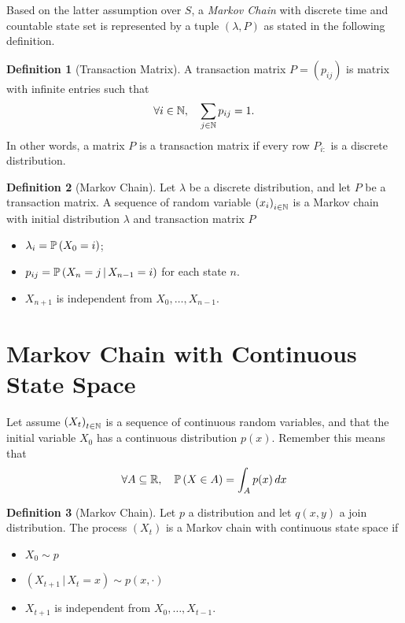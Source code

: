 \documentclass{report}
\theoremstyle{definition}
\newtheorem{defn}{Definition}
\begin{document}
Based on the latter assumption over $S$, a \textit{Markov Chain}  with
discrete time and countable state set is represented by a tuple 
$\left( \lambda,P \right)$ as stated in the following definition.

\begin{defn}[Transaction Matrix]
  A transaction matrix $P=\left( p_{ij} \right)$ is matrix with infinite entries 
  such that
  \begin{equation}
    \forall i\in\mathbb{N},\quad \sum_{j\in\mathbb{N}} p_{ij} = 1.
    \label{eq:transaction-matrix}
  \end{equation}
  In other words, a matrix $P$ is a transaction matrix if every row $P_{i:}$
  is a discrete distribution.
\end{defn}
\begin{defn}[Markov Chain]
  Let $\lambda$ be a discrete distribution, and let $P$ be a transaction
  matrix. A sequence of random variable $\left( x_i \right)_{i\in\mathbb{N}}$ is a
  Markov chain with initial distribution $\lambda$ and transaction matrix
  $P$ 
  \begin{itemize}
    \item $\lambda_i = \mathbb{P}\left( X_0=i \right)$;
    \item $p_{ij} = \mathbb{P}\left( X_n=j\,\vert\, X_{n-1}=i \right)$ for each
      state $n$.
    \item $X_{n+1}$ is independent from $X_0,\dots,X_{n-1}$.
  \end{itemize}
\end{defn}

\section{Markov Chain with Continuous State Space}
Let assume $\left(X_t \right)_{t\in\mathbb{N}}$ is a sequence of continuous random
variables, and that the initial variable $X_0$ has a continuous
distribution $p(x)$. Remember this means that
\begin{equation}
  \forall A\subseteq \mathbb{R},\quad \mathbb{P}\left( X\in A \right)=\int_A p(x)\,dx
  \label{eq:distribution}
\end{equation}
\begin{defn}[Markov Chain]
  Let $p$ a distribution and let $q(x,y)$ a join distribution. The process
$\left( X_t \right)$ is a Markov chain with continuous state space if
\begin{itemize}
  \item $X_0\sim p$
  \item $\left(X_{t+1}\,\vert\, X_t=x \right) \sim p(x,\cdot)$
  \item $X_{t+1}$ is independent from $X_0,\dots,X_{t-1}$.
\end{itemize}
\end{defn}
\end{document}
